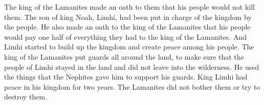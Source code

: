 The king of the Lamanites made an oath to them that his people would not kill them.
\bverse \iffalse And also Limhi, being the son of the king, having the kingdom conferred upon him by the people, made oath unto the king of the Lamanites that his people should pay tribute unto him, even one half of all they possessed. \fi
The son of king Noah, Limhi, had been put in charge of the kingdom by the people. He also made an oath to the king of the Lamanites that his people would pay one half of everything they had to the king of the Lamanites.
\bverse \iffalse And it came to pass that Limhi began to establish the kingdom and to establish peace among his people. \fi
And Limhi started to build up the kingdom and create peace among his people.
\bverse \iffalse And the king of the Lamanites set guards round about the land, that he might keep the people of Limhi in the land, that they might not depart into the wilderness; and he did support his guards out of the tribute which he did receive from the Nephites. \fi
The king of the Lamanites put guards all around the land, to make sure that the people of Limhi stayed in the land and did not leave into the wilderness. He used the things that the Nephites gave him to support his guards.
\bverse \iffalse And now king Limhi did have continual peace in his kingdom for the space of two years, that the Lamanites did not molest them nor seek to destroy them. \fi
King Limhi had peace in his kingdom for two years. The Lamanites did not bother them or try to destroy them.

